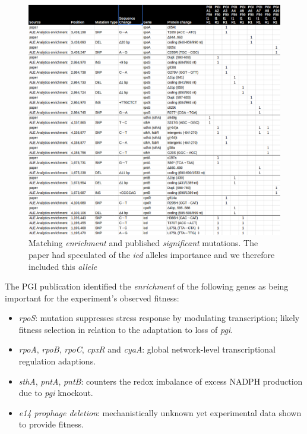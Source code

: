 \documentclass[12pt,final,masters,chapterheads]{ucsd}  %
\begin{document}
\begin{figure}[h!]
  \caption{Matching \textit{enrichment} and published \textit{significant} mutations. The paper had speculated of the \textit{icd} alleles importance and we therefore included this \textit{allele}}
  \centering
  \includegraphics[width=\textwidth]{pgi_matching_enrichment_mutations.png}
\end{figure}

The PGI publication identified the \textit{enrichment} of the following genes as being important for the experiment's observed fitness:

\begin{itemize}
\item \textit{rpoS}: mutation suppresses stress response by modulating transcription; likely fitness selection in relation to the adaptation to loss of \textit{pgi}.
\item \textit{rpoA}, \textit{rpoB}, \textit{rpoC}, \textit{cpxR} and \textit{cyaA}: global network-level transcriptional regulation adaptions.
\item \textit{sthA}, \textit{pntA}, \textit{pntB}: counters the redox imbalance of excess NADPH production due to \textit{pgi} knockout.
\item \textit{e14 prophage deletion}: mechanistically unknown yet experimental data shown to provide fitness.
\end{itemize}
\end{document}

